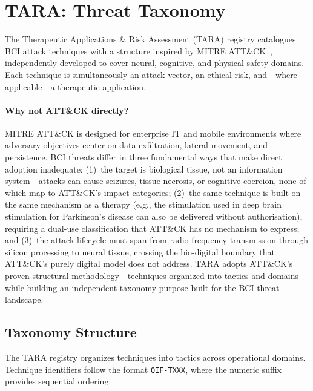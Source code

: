 
\section{TARA: Threat Taxonomy}
\label{sec:tara}

The Therapeutic Applications \& Risk Assessment (TARA) registry catalogues BCI
attack techniques with a structure inspired by MITRE
ATT\&CK~\cite{mitre2024attack}, independently developed to cover neural,
cognitive, and physical safety domains. Each
technique is simultaneously an attack vector, an ethical risk, and---where
applicable---a therapeutic application.

\paragraph{Why not ATT\&CK directly?}
MITRE ATT\&CK is designed for enterprise IT and mobile environments where
adversary objectives center on data exfiltration, lateral movement, and
persistence. BCI threats differ in three fundamental ways that make direct
adoption inadequate: (1)~the target is biological tissue, not an information
system---attacks can cause seizures, tissue necrosis, or cognitive coercion,
none of which map to ATT\&CK's impact categories; (2)~the same technique is
built on the same mechanism as a therapy (e.g., the stimulation used in deep
brain stimulation for Parkinson's disease can also be delivered without authorisation), requiring a
dual-use classification that ATT\&CK has no mechanism to express; and (3)~the
attack lifecycle must span from radio-frequency transmission through silicon
processing to neural tissue, crossing the bio-digital boundary that ATT\&CK's
purely digital model does not address. TARA adopts ATT\&CK's proven structural
methodology---techniques organized into tactics and domains---while building an
independent taxonomy purpose-built for the BCI threat landscape.

\subsection{Taxonomy Structure}

The TARA registry organizes \SnapshotTechniques{} techniques into \SnapshotTactics{} tactics across \SnapshotDomains{} operational
domains. Technique identifiers follow the format \texttt{QIF-TXXX}, where the
numeric suffix provides sequential ordering.

